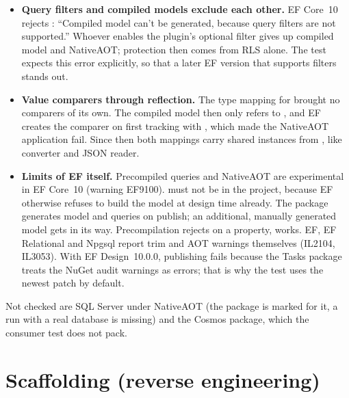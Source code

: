 \begin{itemize}
  \item \textbf{Query filters and compiled models exclude each other.} EF Core~10 rejects
    : “Compiled model can't be generated, because query filters are not
    supported.” Whoever enables the plugin's optional filter gives up compiled model and
    NativeAOT; protection then comes from RLS alone. The test expects this error explicitly, so
    that a later EF version that supports filters stands out.
  \item \textbf{Value comparers through reflection.} The type mapping for  brought
    no comparers of its own. The compiled model then only refers to
    , and
    EF creates the comparer on first tracking with ,
    which made the NativeAOT application fail. Since then both mappings carry shared instances
    from , like converter and
    JSON reader.
  \item \textbf{Limits of EF itself.} Precompiled queries and NativeAOT are experimental in EF
    Core~10 (warning EF9100).  must not be in the project, because
    EF otherwise refuses to build the model at design time already. The package
    generates model and queries on publish; an additional, manually generated model gets in its
    way. Precompilation rejects  on a  property,
     works. EF, EF Relational and Npgsql report trim and AOT warnings themselves
    (IL2104, IL3053). With EF Design~10.0.0, publishing fails because the Tasks package treats
    the NuGet audit warnings as errors; that is why the test uses the newest patch by default.
\end{itemize}

Not checked are SQL Server under NativeAOT (the package is marked for it, a run with a real
database is missing) and the Cosmos package, which the consumer test does not pack.


\chapter{Scaffolding (reverse engineering)}\label{ch:scaffolding-reverse-engineering}

